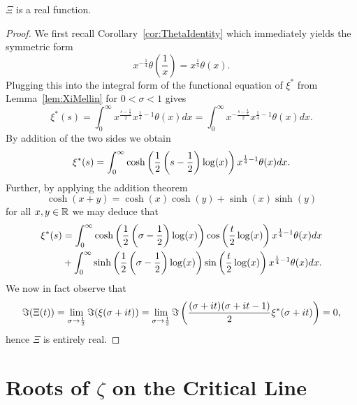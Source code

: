 \begin{lemma}
	$\Xi$ is a real function.
\end{lemma}
\begin{proof}
	We first recall Corollary~\ref{cor:ThetaIdentity} which immediately yields the symmetric form
\begin{equation*}
	x^{-\frac{1}{4}} \theta(\frac{1}{x}) = x^{\frac{1}{4}} \theta(x).
\end{equation*}
	Plugging this into the integral form of the functional equation of $\xi^*$ from Lemma~\ref{lem:XiMellin} for $0 < \sigma < 1$ gives
\begin{equation*}
	\xi^*(s) = \int _0 ^\infty x^{\frac{s - \frac{1}{2}}{2}} x^{\frac{1}{4} - 1} \theta(x) dx = \int _0 ^\infty x^{-\frac{s - \frac{1}{2}}{2}} x^{\frac{1}{4} - 1} \theta(x) dx.
\end{equation*}
	By addition of the two sides we obtain
\begin{equation*}
	\xi^*(s) = \int _0 ^\infty \cosh\left(\frac{1}{2} \left(s - \frac{1}{2}\right) \log(x)\right) x^{\frac{1}{4} - 1} \theta(x) dx.
\end{equation*}
	Further, by applying the addition theorem
\begin{equation*}
	\cosh(x + y) = \cosh(x)\cosh(y) + \sinh(x) \sinh(y)
\end{equation*}	
	for all $x,y \in \mathbb{R}$ we may deduce that
\begin{equation*}
\begin{aligned}	
	\xi^*(s) 
		&= \int _0 ^\infty \cosh\left(\frac{1}{2} \left(\sigma - \frac{1}{2}\right) \log(x)\right) \cos\left(\frac{t}{2} \log(x)\right) x^{\frac{1}{4} - 1} \theta(x) dx \\
		&+ \int _0 ^\infty \sinh\left(\frac{1}{2} \left(\sigma - \frac{1}{2}\right) \log(x)\right) \sin\left(\frac{t}{2} \log(x)\right) x^{\frac{1}{4} - 1} \theta(x) dx.
\end{aligned}
\end{equation*}
	We now in fact observe that
\begin{equation*}
	\Im(\Xi(t)) = \lim _{\sigma \to \frac{1}{2}} \Im(\xi(\sigma + it)) = \lim _{\sigma \to \frac{1}{2}} \Im\left(\frac{(\sigma + it)(\sigma + it - 1)}{2}\xi^*(\sigma + it)\right) = 0,
\end{equation*}
	hence $\Xi$ is entirely real.
\end{proof}


\section{Roots of $\zeta$ on the Critical Line}


